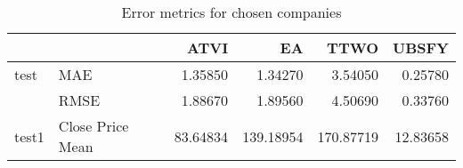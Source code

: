 \begin{table}
\centering
\caption{Error metrics for chosen companies}
\begin{tabular}{llrrrr}
\toprule
      &                  &     ATVI &        EA &      TTWO &    UBSFY \\
\midrule
test & MAE &  1.35850 &   1.34270 &   3.54050 &  0.25780 \\
      & RMSE &  1.88670 &   1.89560 &   4.50690 &  0.33760 \\
test1 & Close Price Mean & 83.64834 & 139.18954 & 170.87719 & 12.83658 \\
\bottomrule
\end{tabular}
\end{table}
